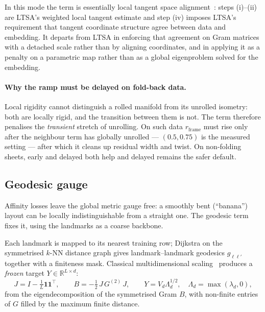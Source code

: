 \documentclass[12pt]{iopart}
\theoremstyle{definition}
\theoremstyle{plain}
\theoremstyle{remark}
\newcommand{\R}{\mathbb{R}}
\begin{document}
In this mode the term is essentially local tangent space
alignment~\cite{zhang2004ltsa}: steps (i)--(ii) are LTSA's weighted local
tangent estimate and step (iv) imposes LTSA's requirement that tangent
coordinate structure agree between data and embedding. It departs from LTSA in
enforcing that agreement on Gram matrices with a detached scale rather than by
aligning coordinates, and in applying it as a penalty on a parametric map
rather than as a global eigenproblem solved for the embedding.

\paragraph{Why the ramp must be delayed on fold-back data.}
Local rigidity cannot distinguish a rolled manifold from its unrolled isometry:
both are locally rigid, and the transition between them is not. The term
therefore penalises the \emph{transient} stretch of unrolling. On such data
$r_{\mathrm{frame}}$ must rise only after the neighbour term has globally
unrolled --- $(0.5,0.75)$ is the measured setting --- after which it cleans up
residual width and twist. On non-folding sheets, early and delayed both help
and delayed remains the safer default.

\subsection{Geodesic gauge}
\label{sec:geo}

Affinity losses leave the global metric gauge free: a smoothly bent
(``banana'') layout can be locally indistinguishable from a straight one. The
geodesic term fixes it, using the landmarks as a coarse backbone.

Each landmark is mapped to its nearest training row; Dijkstra on the
symmetrised $k$-NN distance graph gives landmark--landmark geodesics
$g_{\ell\ell'}$ together with a finiteness mask. Classical
multidimensional scaling~\cite{torgerson1952,isomap2000} produces a
\emph{frozen} target $Y\in\R^{L\times d}$:
\begin{equation}
\label{eq:cmds}
J = I-\tfrac1L\bm{1}\bm{1}^\top,
\qquad
B = -\tfrac12\,J\,G^{(2)}\,J,
\qquad
Y = V_d\Lambda_d^{1/2},
\quad \Lambda_d=\max(\lambda_d,0),
\end{equation}
from the eigendecomposition of the symmetrised Gram $B$, with non-finite
entries of $G$ filled by the maximum finite distance.
\end{document}
